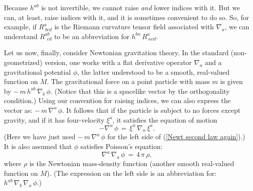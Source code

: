 \documentclass [12] {article}
\theoremstyle{plain}
\numberwithin{figure}{subsection}
\numberwithin{proposition}{subsection}
\begin{document}
Because $h^{ab}$ is not invertible, we cannot raise \emph{and} lower indices with it. But we can, at least, raise indices with it, and it is sometimes convenient to do so.  So, for example, if $R^a_{\ bcd}$ is the Riemann curvature tensor field associated with $\nabla_a$, we can understand  $R^{ab}_{\ \ cd}$ to be an abbreviation for  $h^{bn} \, R^{a}_{\ ncd}$.   
   
\begin{sloppypar}
Let us now, finally, consider Newtonian gravitation theory.  In the standard (non-geometrized) version, one works with a flat derivative operator $\nabla_a$ and a gravitational potential $\phi$, the latter understood to be a smooth, real-valued function on $M$. The gravitational force on a point particle with mass $m$ is given by  $- \, m \, h^{ab} \, \nabla_b \, \phi$.   (Notice that this is a spacelike vector by the orthogonality condition.) Using our convention for raising indices, we can also express the vector as:   $- \, m \, \nabla^a \, \phi$.   It follows that  if the particle is subject to no forces except gravity, and if it has four-velocity $\xi^a$,  it satisfies the equation of motion    
\begin{equation}  \label{mass free equation of motion}
- \nabla^a \, \phi  \, = \, \xi^n \, \nabla_n \, \xi^a.
\end{equation}	
(Here we have just used  $- \, m \, \nabla^a \, \phi $ for the left side of (\ref{Newt second law again}).) It is also assumed that $\phi$  satisfies Poisson's equation:
\begin{equation}
\nabla^a \, \nabla_a  \, \phi  \,  = \,   4  \, \pi  \, \rho,	
\end{equation}	
where $\rho$ is the Newtonian mass-density function (another smooth real-valued function on $M$).  (The expression on the left side is an abbreviation for:  $h^{ab} \, \nabla_b \, \nabla_a  \, \phi $.)
\end{sloppypar}
\end{document}
